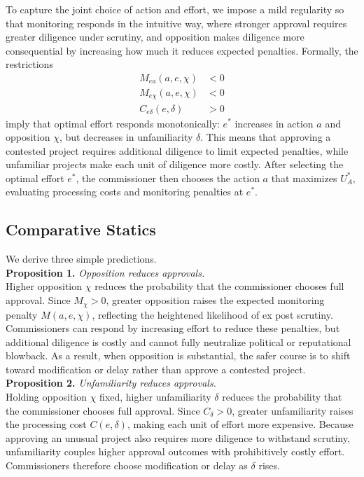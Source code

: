 To capture the joint choice of action and effort, we impose a mild regularity so that monitoring responds in the intuitive way, where stronger approval requires greater diligence under scrutiny, and opposition makes diligence more consequential by increasing how much it reduces expected penalties. Formally, the restrictions
\[
\begin{aligned}
M_{ea}(a,e,\chi) &< 0 \\
M_{e\chi}(a,e,\chi) &< 0 \\
C_{e\delta}(e,\delta) &> 0
\end{aligned}
\]
imply that optimal effort responds monotonically: $e^*$ increases in action $a$ and opposition $\chi$, but decreases in unfamiliarity $\delta$. This means that approving a contested project requires additional diligence to limit expected penalties, while unfamiliar projects make each unit of diligence more costly. After selecting the optimal effort $e^*$, the commissioner then chooses the action $a$ that maximizes $U_A^*$, evaluating processing costs and monitoring penalties at $e^*$.

\subsection{Comparative Statics}

We derive three simple predictions.\\


\textbf{Proposition 1.} \textit{Opposition reduces approvals.}\\

Higher opposition $\chi$ reduces the probability that the commissioner chooses full approval. Since $M_\chi > 0$, greater opposition raises the expected monitoring penalty $M(a,e,\chi)$, reflecting the heightened likelihood of ex post scrutiny. Commissioners can respond by increasing effort to reduce these penalties, but additional diligence is costly and cannot fully neutralize political or reputational blowback. As a result, when opposition is substantial, the safer course is to shift toward modification or delay rather than approve a contested project.\\

\textbf{Proposition 2.} \textit{Unfamiliarity reduces approvals.}\\

Holding opposition $\chi$ fixed, higher unfamiliarity $\delta$ reduces the probability that the commissioner chooses full approval. Since $C_\delta > 0$, greater unfamiliarity raises the processing cost $C(e,\delta)$, making each unit of effort more expensive. Because approving an unusual project also requires more diligence to withstand scrutiny, unfamiliarity couples higher approval outcomes with prohibitively costly effort. Commissioners therefore choose modification or delay as $\delta$ rises.\\

